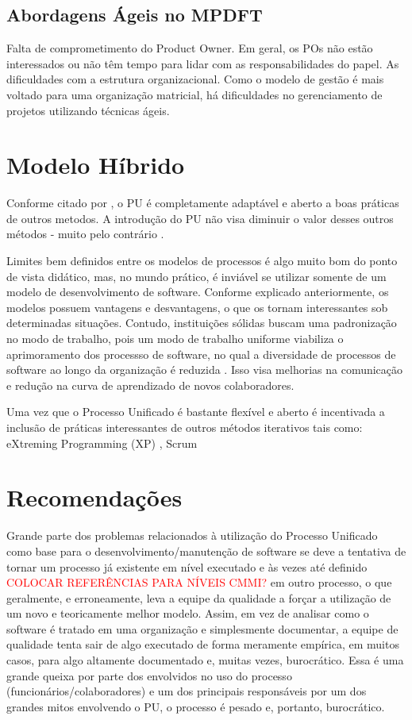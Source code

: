 \documentclass[
	article,			%
	11pt,				%
	oneside,			%
	a4paper,			%
	english,			%
	brazil,				%
	sumario=tradicional
	]{abntex2}
\begin{document}
\subsection{Abordagens Ágeis no MPDFT}

   Falta de comprometimento do Product Owner. Em geral, os POs não estão
   interessados ou não têm tempo para lidar com as responsabilidades do papel.
   As dificuldades com a estrutura organizacional. Como o modelo de gestão é
   mais voltado para uma organização matricial, há dificuldades no
   gerenciamento de projetos utilizando técnicas ágeis.

\section{Modelo Híbrido}

Conforme citado por , o PU é completamente
adaptável e aberto a boas práticas de outros metodos. A introdução do PU não
visa diminuir o valor desses outros métodos - muito pelo contrário
\cite{larman2007utilizando}.

Limites bem definidos entre os modelos de processos é algo muito bom do ponto de
vista didático, mas, no mundo prático, é inviável se utilizar somente de um
modelo de desenvolvimento de software. Conforme explicado anteriormente, os
modelos possuem vantagens e desvantagens, o que os tornam interessantes sob
determinadas situações. Contudo, instituições sólidas buscam uma padronização no
modo de trabalho, pois um modo de trabalho uniforme viabiliza o aprimoramento
dos processso de software, no qual a diversidade de processos de software ao
longo da organização é reduzida \cite{sommerville2007}. Isso visa melhorias na
comunicação e redução na curva de aprendizado de novos colaboradores.

Uma vez que o Processo Unificado é bastante flexível e aberto é incentivada a
inclusão de práticas interessantes de outros métodos iterativos tais como:
eXtreming Programming (XP) \cite{Beck:1999:ECE:619045.621348}, Scrum
\cite{schwaber2002agile}

\section{Recomendações}

Grande parte dos problemas relacionados à utilização do Processo Unificado como
base para o desenvolvimento/manutenção de software se deve a tentativa de tornar
um processo já existente em nível executado e às vezes até definido
\textcolor{red}{COLOCAR REFERÊNCIAS PARA NÍVEIS CMMI?} em outro processo, o que
geralmente, e erroneamente, leva a equipe da qualidade a forçar a utilização de
um novo e teoricamente melhor modelo. Assim, em vez de analisar como o software
é tratado em uma organização e simplesmente documentar, a equipe de qualidade
tenta sair de algo executado de forma meramente empírica, em muitos casos, para
algo altamente documentado e, muitas vezes, burocrático. Essa é uma grande
queixa por parte dos envolvidos no uso do processo (funcionários/colaboradores)
e um dos principais responsáveis por um dos grandes mitos envolvendo o PU, o
processo é pesado e, portanto, burocrático.
\end{document}

